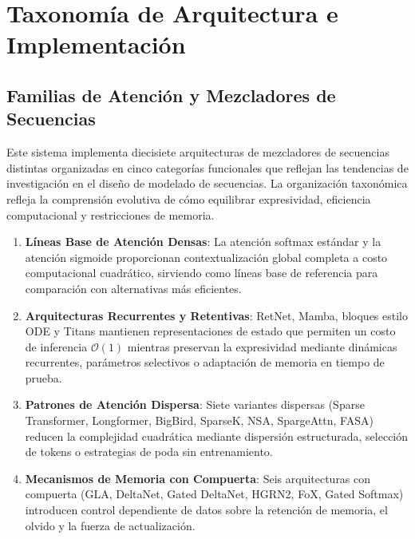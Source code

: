 \documentclass[11pt,a4paper]{article}
\begin{document}
\section{Taxonomía de Arquitectura e Implementación}
\label{sec:architecture-taxonomy}

\subsection{Familias de Atención y Mezcladores de Secuencias}
\label{sec:attention-families}

Este sistema implementa diecisiete arquitecturas de mezcladores de secuencias distintas organizadas en cinco categorías funcionales que reflejan las tendencias de investigación en el diseño de modelado de secuencias. La organización taxonómica refleja la comprensión evolutiva de cómo equilibrar expresividad, eficiencia computacional y restricciones de memoria.

\begin{enumerate}[leftmargin=*]
    \item \textbf{Líneas Base de Atención Densas}: La atención softmax estándar y la atención sigmoide proporcionan contextualización global completa a costo computacional cuadrático, sirviendo como líneas base de referencia para comparación con alternativas más eficientes.
    \item \textbf{Arquitecturas Recurrentes y Retentivas}: RetNet, Mamba, bloques estilo ODE y Titans mantienen representaciones de estado que permiten un costo de inferencia $\mathcal{O}(1)$ mientras preservan la expresividad mediante dinámicas recurrentes, parámetros selectivos o adaptación de memoria en tiempo de prueba.
    \item \textbf{Patrones de Atención Dispersa}: Siete variantes dispersas (Sparse Transformer, Longformer, BigBird, SparseK, NSA, SpargeAttn, FASA) reducen la complejidad cuadrática mediante dispersión estructurada, selección de tokens o estrategias de poda sin entrenamiento.
    \item \textbf{Mecanismos de Memoria con Compuerta}: Seis arquitecturas con compuerta (GLA, DeltaNet, Gated DeltaNet, HGRN2, FoX, Gated Softmax) introducen control dependiente de datos sobre la retención de memoria, el olvido y la fuerza de actualización.
\end{enumerate}
\end{document}
